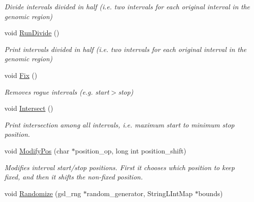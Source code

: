 \begin{DoxyCompactItemize}
\begin{DoxyCompactList}\small\item\em Divide intervals divided in half (i.e. two intervals for each original interval in the genomic region) \end{DoxyCompactList}\item 
\hypertarget{classGenomicRegionBED_a5f456b4af154c98968370568828d6e3d}{
void \hyperlink{classGenomicRegionBED_a5f456b4af154c98968370568828d6e3d}{RunDivide} ()}
\label{classGenomicRegionBED_a5f456b4af154c98968370568828d6e3d}

\begin{DoxyCompactList}\small\item\em Print intervals divided in half (i.e. two intervals for each original interval in the genomic region) \end{DoxyCompactList}\item 
\hypertarget{classGenomicRegionBED_aac069dcf513265f7756b72c106f2765c}{
void \hyperlink{classGenomicRegionBED_aac069dcf513265f7756b72c106f2765c}{Fix} ()}
\label{classGenomicRegionBED_aac069dcf513265f7756b72c106f2765c}

\begin{DoxyCompactList}\small\item\em Removes rogue intervals (e.g. start$>$stop) \end{DoxyCompactList}\item 
\hypertarget{classGenomicRegionBED_acf815a65712e82bf3f8c596c795f55c4}{
void \hyperlink{classGenomicRegionBED_acf815a65712e82bf3f8c596c795f55c4}{Intersect} ()}
\label{classGenomicRegionBED_acf815a65712e82bf3f8c596c795f55c4}

\begin{DoxyCompactList}\small\item\em Print intersection among all intervals, i.e. maximum start to minimum stop position. \end{DoxyCompactList}\item 
void \hyperlink{classGenomicRegionBED_ac515c70f443db400f911452ed359433b}{ModifyPos} (char $\ast$position\_\-op, long int position\_\-shift)
\begin{DoxyCompactList}\small\item\em Modifies interval start/stop positions. First it chooses which position to keep fixed, and then it shifts the non-\/fixed position. \end{DoxyCompactList}\item 
\hypertarget{classGenomicRegionBED_a920d47deb095506c311da2b2324e7a14}{
void \hyperlink{classGenomicRegionBED_a920d47deb095506c311da2b2324e7a14}{Randomize} (gsl\_\-rng $\ast$random\_\-generator, StringLIntMap $\ast$bounds)}
\label{classGenomicRegionBED_a920d47deb095506c311da2b2324e7a14}


\end{DoxyCompactItemize}
